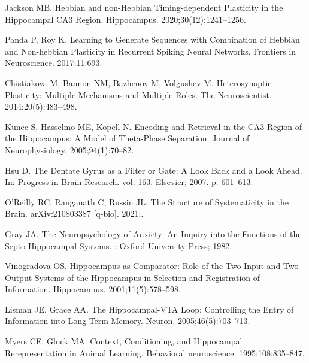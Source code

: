 \documentclass[10pt,letterpaper]{article}
\begin{document}
\begin{thebibliography}{10}
  Jackson MB.
  \newblock Hebbian and non-{{Hebbian}} Timing-dependent Plasticity in the
    Hippocampal {{CA3}} Region.
  \newblock Hippocampus. 2020;30(12):1241--1256.
  
  Panda P, Roy K.
  \newblock Learning to {{Generate Sequences}} with {{Combination}} of
    {{Hebbian}} and {{Non-hebbian Plasticity}} in {{Recurrent Spiking Neural
    Networks}}.
  \newblock Frontiers in Neuroscience. 2017;11:693.
  
  Chistiakova M, Bannon NM, Bazhenov M, Volgushev M.
  \newblock Heterosynaptic {{Plasticity}}: {{Multiple Mechanisms}} and {{Multiple
    Roles}}.
  \newblock The Neuroscientist. 2014;20(5):483--498.
  
  Kunec S, Hasselmo ME, Kopell N.
  \newblock Encoding and {{Retrieval}} in the {{CA3 Region}} of the
    {{Hippocampus}}: {{A Model}} of {{Theta-Phase Separation}}.
  \newblock Journal of Neurophysiology. 2005;94(1):70--82.
  
  Hsu D.
  \newblock The Dentate Gyrus as a Filter or Gate: A Look Back and a Look Ahead.
  \newblock In: Progress in {{Brain Research}}. vol. 163. {Elsevier}; 2007. p.
    601--613.
  
  O'Reilly RC, Ranganath C, Russin JL.
  \newblock The {{Structure}} of {{Systematicity}} in the {{Brain}}.
  \newblock arXiv:210803387 [q-bio]. 2021;.
  
  Gray JA.
  \newblock The Neuropsychology of Anxiety: {{An}} Inquiry into the Functions of
    the Septo-Hippocampal Systems.
  : {Oxford University Press}; 1982.
  
  Vinogradova OS.
  \newblock Hippocampus as Comparator: Role of the Two Input and Two Output
    Systems of the Hippocampus in Selection and Registration of Information.
  \newblock Hippocampus. 2001;11(5):578--598.
  
  Lisman JE, Grace AA.
  \newblock The Hippocampal-{{VTA}} Loop: {{Controlling}} the Entry of
    Information into Long-Term Memory.
  \newblock Neuron. 2005;46(5):703--713.
  
  Myers CE, Gluck MA.
  \newblock Context, Conditioning, and Hippocampal Rerepresentation in Animal
    Learning.
  \newblock Behavioral neuroscience. 1995;108:835--847.
  

\end{thebibliography}
\end{document}
